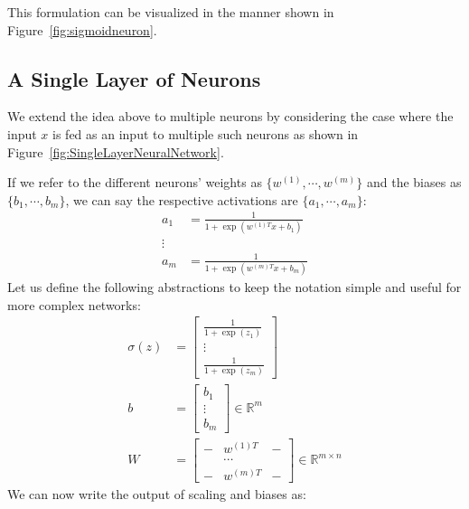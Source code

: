 \documentclass{tufte-handout}
\begin{document}
This formulation can be visualized in the manner shown in Figure~\ref{fig:sigmoidneuron}.

\subsection{A Single Layer of Neurons}\label{sec:neuronlayer}

We extend the idea above to multiple neurons by considering the case where the input $x$ is fed as an input to multiple such neurons as shown in Figure~\ref{fig:SingleLayerNeuralNetwork}. 

If we refer to the different neurons' weights as $\{w^{(1)}, \cdots, w^{(m)}\}$ and the biases as $\{b_1, \cdots, b_m\}$, we can say the respective activations are  $\{a_1, \cdots, a_m\}$:
\begin{align*}
a_1 &= \frac{1}{1 + \exp(w^{(1)T}x + b_1)}\\
\vdots \\
a_m &= \frac{1}{1 + \exp(w^{(m)T}x + b_m)}
\end{align*}
Let us define the following abstractions to keep the notation simple and useful for more complex networks:
\begin{align*}
\sigma(z) &= \begin{bmatrix}  \frac{1}{1 + \exp(z_1)}\\ \vdots \\  \frac{1}{1 + \exp(z_m)}\end{bmatrix}\\
b &= \begin{bmatrix}  b_1\\ \vdots \\  b_m \end{bmatrix} \in \mathbb{R}^{m}\\
W &= \begin{bmatrix} - & w^{(1)T} & -\\ & \cdots & \\ - & w^{(m)T} & - \end{bmatrix} \in \mathbb{R}^{m\times n}
\end{align*}
We can now write the output of scaling and biases as:
\end{document}
